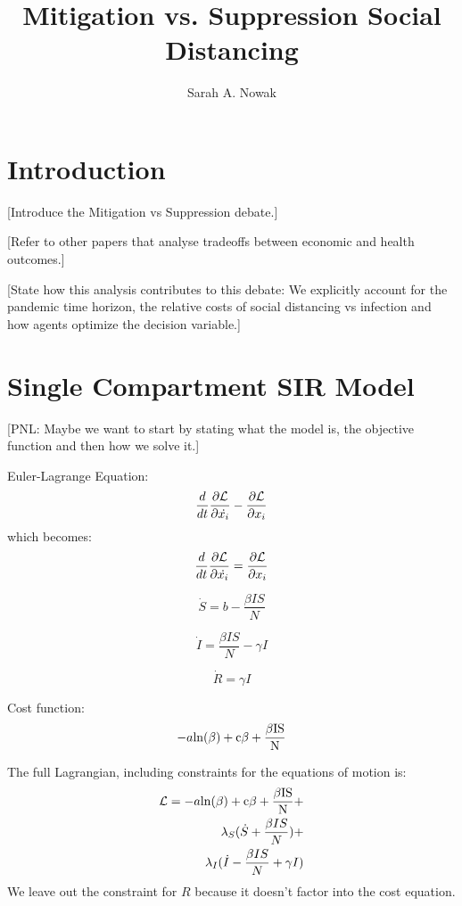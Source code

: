 \documentclass[11pt]{article} %
\title{Mitigation vs. Suppression Social Distancing}
\author{Sarah A. Nowak}
\date{} %
\begin{document}
\maketitle

\section{Introduction}

[Introduce the Mitigation vs Suppression debate.]

[Refer to other papers that analyse tradeoffs between economic and health outcomes.]

[State how this analysis contributes to this debate: We explicitly account for the pandemic time horizon, the relative costs of social distancing vs infection and how agents optimize the decision variable.]

\section{Single Compartment SIR Model}

[PNL: Maybe we want to start by stating what the model is, the objective function and then how we solve it.]

Euler-Lagrange Equation:
\begin{equation}
\frac{d}{dt} \frac{\partial \cal{L}}{\partial {\dot{x_i}}}-\frac{\partial \cal{L}}{\partial x_i}
\end{equation}
 which becomes:
\begin{equation}
\frac{d}{dt} \frac{\partial \cal{L}}{\partial {\dot{x_i}}}=\frac{\partial \cal{L}}{\partial x_i}
\label{eq:EL}
\end{equation}


\begin{equation}
\dot{S}= b-\frac{\beta IS}{N}
\end{equation}


\begin{equation}
\dot{I}=\frac{\beta IS}{N}-\gamma I
\label{eq:didt}
\end{equation}

\begin{equation}
\dot{R}=\gamma I
\end{equation}

Cost function:
\begin{equation}
-a\rm{ln}({\beta})+c\beta+\frac{\beta IS}{N}
\label{eq:cost}
\end{equation}

The full Lagrangian, including constraints for the equations of motion is:
\begin{equation}
\begin{split}
\mathcal{L} = -a \rm {ln}({\beta})+c\beta+\frac{\beta IS}{N} +\\
\lambda_S(\dot{S} +\frac{\beta IS}{N})+\\
\lambda_I(\dot{I}-\frac{\beta IS}{N}+\gamma I)
\end{split}
\end{equation}
We leave out the constraint for $R$ because it doesn't factor into the cost equation.
\end{document}
